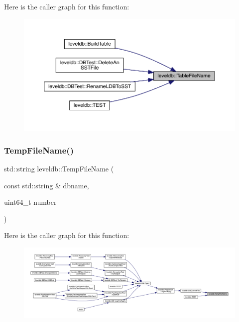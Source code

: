 Here is the caller graph for this function\+:
\nopagebreak
\begin{figure}[H]
\begin{center}
\leavevmode
\includegraphics[width=350pt]{namespaceleveldb_a0d893a7fbbbc4a94ec75af4f6be33dbb_icgraph}
\end{center}
\end{figure}
\mbox{\label{namespaceleveldb_a0563c700d6ff17e88f429464c1442da1}} 
\subsubsection{\texorpdfstring{TempFileName()}{TempFileName()}}
{\footnotesize\ttfamily std\+::string leveldb\+::\+Temp\+File\+Name (\begin{DoxyParamCaption}\item[{const std\+::string \&}]{dbname,  }\item[{uint64\+\_\+t}]{number }\end{DoxyParamCaption})}

Here is the caller graph for this function\+:
\nopagebreak
\begin{figure}[H]
\begin{center}
\leavevmode
\includegraphics[width=350pt]{namespaceleveldb_a0563c700d6ff17e88f429464c1442da1_icgraph}
\end{center}
\end{figure}
\mbox{\label{namespaceleveldb_a28c411f7a30e2e869123a26f6e69e733}} 
